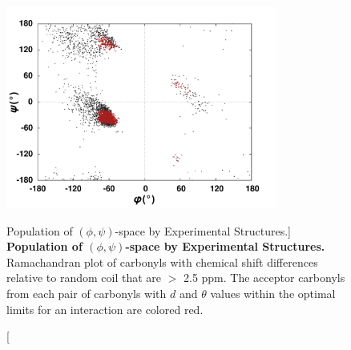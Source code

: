 \begin{figure}
\includegraphics[width=3.5in]{figs/npistar/05.png}
\caption
      [Population of $(\phi,\psi)$-space by Experimental Structures.]{
  {\bf Population of $(\phi,\psi)$-space by Experimental Structures.}
  \\
  Ramachandran plot of carbonyls with \cnmr{} chemical shift differences
  relative to random coil that are $>$ 2.5 ppm. The acceptor carbonyls from
  each pair of carbonyls with $d$ and $\theta$ values within the optimal
  limits for an \npistar{} interaction are colored red.
}
\end{figure}


